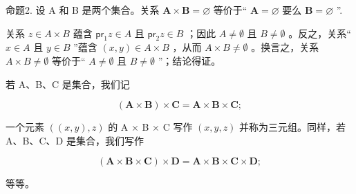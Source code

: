命题2. 设 A 和 B 是两个集合。关系 \(\mathbf{A} \times \mathbf{B} = \varnothing\) 等价于“ \(\mathbf{A} = \varnothing\) 要么 \(\mathbf{B} = \varnothing\) ''.

关系 \(z \in A \times B\) 蕴含 \(\mathsf{pr}_1z \in A\) 且 \(\mathsf{pr}_2z \in B\) ；因此 \(A \neq \emptyset\) 且 \(B \neq \emptyset\) 。反之，关系“ \(x \in A\) 且 \(y \in B\) ”蕴含 \((x, y) \in A \times B\) ，从而 \(A \times B \neq \emptyset\) 。换言之，关系 \(A \times B \neq \emptyset\) 等价于“ \(A \neq \emptyset\) 且 \(B \neq \emptyset\) ”；结论得证。

若 A、B、C 是集合，我们记

\[
(\mathbf {A} \times \mathbf {B}) \times \mathbf {C} = \mathbf {A} \times \mathbf {B} \times \mathbf {C};
\]

一个元素 \(((x, y), z)\) 的 A × B × C 写作 \((x, y, z)\) 并称为三元组。同样，若 A、B、C、D 是集合，我们写作

\[
(\mathbf {A} \times \mathbf {B} \times \mathbf {C}) \times \mathbf {D} = \mathbf {A} \times \mathbf {B} \times \mathbf {C} \times \mathbf {D};
\]

等等。

